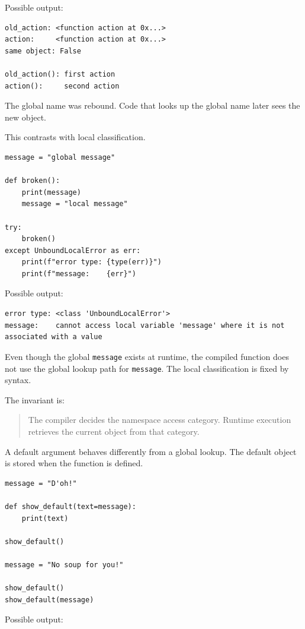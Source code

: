 Possible output:

\begin{verbatim}
old_action: <function action at 0x...>
action:     <function action at 0x...>
same object: False

old_action(): first action
action():     second action
\end{verbatim}

The global name was rebound. Code that looks up the global name later sees the new object.

This contrasts with local classification.

\begin{verbatim}
message = "global message"

def broken():
    print(message)
    message = "local message"

try:
    broken()
except UnboundLocalError as err:
    print(f"error type: {type(err)}")
    print(f"message:    {err}")
\end{verbatim}

Possible output:

\begin{verbatim}
error type: <class 'UnboundLocalError'>
message:    cannot access local variable 'message' where it is not associated with a value
\end{verbatim}

Even though the global \texttt{message} exists at runtime, the compiled function does not use the global lookup path for \texttt{message}. The local classification is fixed by syntax.

The invariant is:

\begin{quote}
The compiler decides the namespace access category. Runtime execution retrieves the current object from that category.
\end{quote}

A default argument behaves differently from a global lookup. The default object is stored when the function is defined.

\begin{verbatim}
message = "D'oh!"

def show_default(text=message):
    print(text)

show_default()

message = "No soup for you!"

show_default()
show_default(message)
\end{verbatim}

Possible output:

